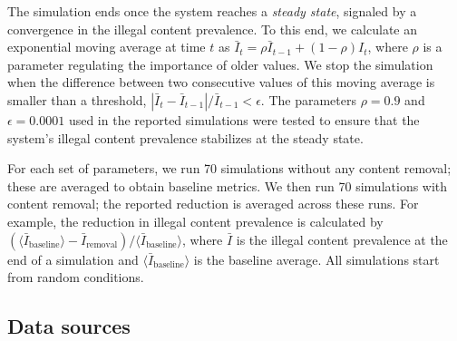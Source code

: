 \documentclass{article}
\begin{document}
The simulation ends once the system reaches a \emph{steady state}, signaled by a convergence in the illegal content prevalence. To this end, we calculate an exponential moving average at time $t$ as $\bar{I}_t = \rho \bar{I}_{t-1} + (1-\rho) I_{t}$, where $\rho$ is a parameter regulating the importance of older values.   
We stop the simulation when the difference between two consecutive values of this moving average is smaller than a threshold, $|\bar{I}_t - \bar{I}_{t-1}| / \bar{I}_{t-1} < \epsilon$. 
The parameters $\rho =0.9$ and $\epsilon = 0.0001$ used in the reported simulations were tested to ensure that the system's illegal content prevalence stabilizes at the steady state. 

For each set of parameters, we run 70 simulations without any content removal; these are averaged to obtain baseline metrics. 
We then run 70 simulations with content removal; the reported reduction is averaged across these runs. 
For example, the reduction in illegal content prevalence is calculated by $(\langle \bar{I}_{\text{baseline}} \rangle - \bar{I}_{\text{removal}}) / \langle \bar{I}_{\text{baseline}} \rangle$, where $\bar{I}$ is the illegal content prevalence at the end of a simulation and $\langle \bar{I}_{\text{baseline}} \rangle$ is the baseline average. 
All simulations start from random conditions. 

\subsection*{Data sources}
\label{sec:datasources}
\end{document}
